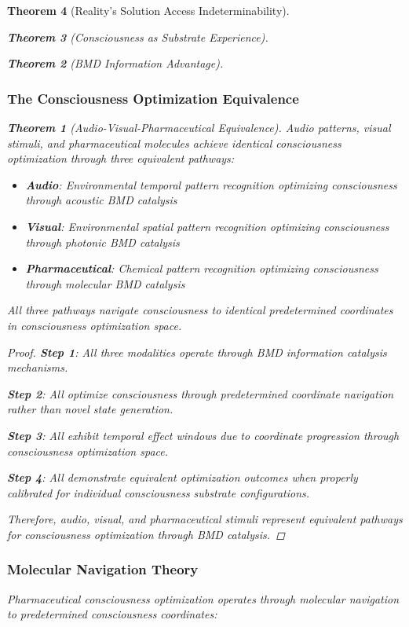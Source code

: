 \documentclass[12pt,a4paper]{article}
\newtheorem{theorem}{Theorem}[section]
\theoremstyle{remark}
\begin{document}
\begin{theorem}[Reality's Solution Access Indeterminability]
\begin{theorem}[Consciousness as Substrate Experience]
\begin{theorem}[BMD Information Advantage]
\subsubsection{The Consciousness Optimization Equivalence}

\begin{theorem}[Audio-Visual-Pharmaceutical Equivalence]
Audio patterns, visual stimuli, and pharmaceutical molecules achieve identical consciousness optimization through three equivalent pathways:
\begin{itemize}
\item \textbf{Audio}: Environmental temporal pattern recognition optimizing consciousness through acoustic BMD catalysis
\item \textbf{Visual}: Environmental spatial pattern recognition optimizing consciousness through photonic BMD catalysis  
\item \textbf{Pharmaceutical}: Chemical pattern recognition optimizing consciousness through molecular BMD catalysis
\end{itemize}
All three pathways navigate consciousness to identical predetermined coordinates in consciousness optimization space.
\end{theorem}

\begin{proof}
\textbf{Step 1}: All three modalities operate through BMD information catalysis mechanisms.

\textbf{Step 2}: All optimize consciousness through predetermined coordinate navigation rather than novel state generation.

\textbf{Step 3}: All exhibit temporal effect windows due to coordinate progression through consciousness optimization space.

\textbf{Step 4}: All demonstrate equivalent optimization outcomes when properly calibrated for individual consciousness substrate configurations.

Therefore, audio, visual, and pharmaceutical stimuli represent equivalent pathways for consciousness optimization through BMD catalysis.
\end{proof}

\subsubsection{Molecular Navigation Theory}

Pharmaceutical consciousness optimization operates through molecular navigation to predetermined consciousness coordinates:


\end{theorem}
\end{theorem}
\end{theorem}
\end{document}
